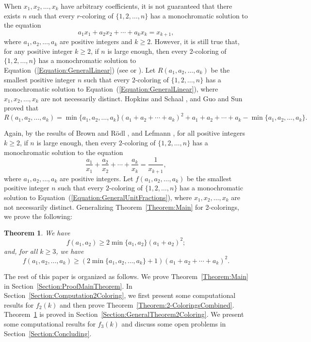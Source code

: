 \documentclass[10pt,a4paper]{amsart}
\newtheorem{theorem}{Theorem}[section]
\begin{document}
When $x_1,x_2,\ldots,x_k$ have arbitrary coefficients, it is not guaranteed that there exists $n$ such that every $r$-coloring of $\{1,2,\ldots,n\}$ has a monochromatic solution to the equation
\begin{equation}\label{Equation:GeneralLinear}
    a_1x_1+a_2x_2+\cdots+a_kx_k=x_{k+1},
\end{equation}
where $a_1,a_2,\ldots,a_k$ are positive integers and $k\geq2$. However, it is still true that, for any positive integer $k\geq2$, if $n$ is large enough, then every $2$-coloring of $\{1,2,\ldots,n\}$ has a monochromatic solution to Equation~(\ref{Equation:GeneralLinear}) (see \cite[Theorem~9.2]{LandmanRobertson2014} or \cite[Theorem~0.1]{MR2007}). Let $R(a_1,a_2,\ldots,a_k)$ be the smallest positive integer $n$ such that every $2$-coloring of $\{1,2,\ldots,n\}$ has a monochromatic solution to Equation~(\ref{Equation:GeneralLinear}), where $x_1,x_2,\ldots,x_k$ are not necessarily distinct. Hopkins and Schaal \cite{HS2005}, and Guo and Sun~\cite{GS2008} proved that \[R(a_1,a_2,\ldots,a_k)=\min\{a_1,a_2,\ldots,a_k\}(a_1+a_2+\cdots+a_k)^2+a_1+a_2+\cdots+a_k-\min\{a_1,a_2,\ldots,a_k\}.\]

Again, by the results of Brown and R\"{o}dl \cite{BrownRodl1991}, and Lefmann \cite{Lefmann1991}, for all positive integers $k\geq2$, if $n$ is large enough, then every $2$-coloring of $\{1,2,\ldots,n\}$ has a monochromatic solution to the equation
\begin{equation}\label{Equation:GeneralUnitFractions}
    \frac{a_1}{x_1}+\frac{a_2}{x_2}+\cdots+\frac{a_k}{x_k}=\frac{1}{x_{k+1}},
\end{equation}
where $a_1,a_2,\ldots,a_k$ are positive integers. Let $f(a_1,a_2,\ldots,a_k)$ be the smallest positive integer $n$ such that every $2$-coloring of $\{1,2,\ldots,n\}$ has a monochromatic solution to Equation~(\ref{Equation:GeneralUnitFractions}), where $x_1,x_2,\ldots,x_k$ are not necessarily distinct. Generalizing Theorem~\ref{Theorem:Main} for 2-colorings, we prove the following:
\begin{theorem}\label{Theorem:General2-Coloring}
We have \[f(a_1,a_2)\geq2\min\{a_1,a_2\}(a_1+a_2)^2;\] and, for all $k\geq3$, we have
    \[
    f(a_1,a_2,\ldots,a_k)\geq(2\min\{a_1,a_2,\ldots,a_k\}+1)(a_1+a_2+\cdots+a_k)^2.
    \]
\end{theorem}



The rest of this paper is organized as follows. We prove Theorem~\ref{Theorem:Main} in Section~\ref{Section:ProofMainTheorem}. In Section~\ref{Section:Computation2Coloring}, we first present some computational results for $f_2(k)$ and then prove Theorem~\ref{Theorem:2-ColoringsCombined}. Theorem~\ref{Theorem:General2-Coloring} is proved in Section~\ref{Section:GeneralTheorem2Coloring}. We present some computational results for $f_3(k)$ and discuss some open problems in Section~\ref{Section:Concluding}.
\end{document}
